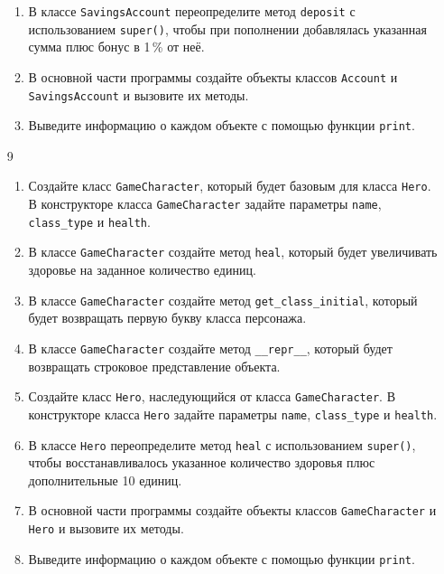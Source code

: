 \begin{enumerate}
\begin{enumerate}
    \item В классе \texttt{SavingsAccount} переопределите метод \texttt{deposit} с использованием \texttt{super()}, чтобы при пополнении добавлялась указанная сумма плюс бонус в 1\,\% от неё.
    
    \item В основной части программы создайте объекты классов \texttt{Account} и \texttt{SavingsAccount} и вызовите их методы.
    
    \item Выведите информацию о каждом объекте с помощью функции \texttt{print}.
\end{enumerate}

\item[9] 
\begin{enumerate}
    \item Создайте класс \texttt{GameCharacter}, который будет базовым для класса \texttt{Hero}. В конструкторе класса \texttt{GameCharacter} задайте параметры \texttt{name}, \texttt{class\_type} и \texttt{health}.
    
    \item В классе \texttt{GameCharacter} создайте метод \texttt{heal}, который будет увеличивать здоровье на заданное количество единиц.
    
    \item В классе \texttt{GameCharacter} создайте метод \texttt{get\_class\_initial}, который будет возвращать первую букву класса персонажа.
    
    \item В классе \texttt{GameCharacter} создайте метод \texttt{\_\_repr\_\_}, который будет возвращать строковое представление объекта.
    
    \item Создайте класс \texttt{Hero}, наследующийся от класса \texttt{GameCharacter}. В конструкторе класса \texttt{Hero} задайте параметры \texttt{name}, \texttt{class\_type} и \texttt{health}.
    
    \item В классе \texttt{Hero} переопределите метод \texttt{heal} с использованием \texttt{super()}, чтобы восстанавливалось указанное количество здоровья плюс дополнительные 10 единиц.
    
    \item В основной части программы создайте объекты классов \texttt{GameCharacter} и \texttt{Hero} и вызовите их методы.
    
    \item Выведите информацию о каждом объекте с помощью функции \texttt{print}.
\end{enumerate}


\end{enumerate}
